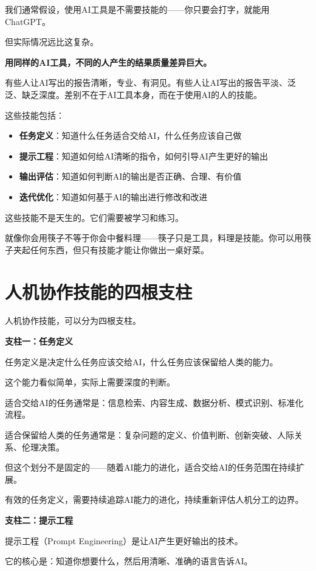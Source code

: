 我们通常假设，使用AI工具是不需要技能的——你只要会打字，就能用ChatGPT。

但实际情况远比这复杂。

\textbf{用同样的AI工具，不同的人产生的结果质量差异巨大。}

有些人让AI写出的报告清晰，专业、有洞见。有些人让AI写出的报告平淡、泛泛、缺乏深度。差别不在于AI工具本身，而在于使用AI的人的技能。

这些技能包括：

\begin{itemize}
\item \textbf{任务定义}：知道什么任务适合交给AI，什么任务应该自己做
\item \textbf{提示工程}：知道如何给AI清晰的指令，如何引导AI产生更好的输出
\item \textbf{输出评估}：知道如何判断AI的输出是否正确、合理、有价值
\item \textbf{迭代优化}：知道如何基于AI的输出进行修改和改进

\end{itemize}
这些技能不是天生的。它们需要被学习和练习。

就像你会用筷子不等于你会中餐料理——筷子只是工具，料理是技能。你可以用筷子夹起任何东西，但只有技能才能让你做出一桌好菜。

\section{人机协作技能的四根支柱}


人机协作技能，可以分为四根支柱。

\textbf{支柱一：任务定义}

任务定义是决定什么任务应该交给AI，什么任务应该保留给人类的能力。

这个能力看似简单，实际上需要深度的判断。

适合交给AI的任务通常是：信息检索、内容生成、数据分析、模式识别、标准化流程。

适合保留给人类的任务通常是：复杂问题的定义、价值判断、创新突破、人际关系、伦理决策。

但这个划分不是固定的——随着AI能力的进化，适合交给AI的任务范围在持续扩展。

有效的任务定义，需要持续追踪AI能力的进化，持续重新评估人机分工的边界。

\textbf{支柱二：提示工程}

提示工程（Prompt Engineering）是让AI产生更好输出的技术。

它的核心是：知道你想要什么，然后用清晰、准确的语言告诉AI。

